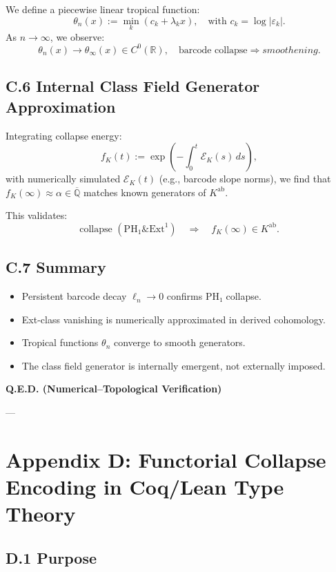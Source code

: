 \documentclass[11pt]{article}
\begin{document}
We define a piecewise linear tropical function:
\[
\theta_n(x) := \min_k (c_k + \lambda_k x), \quad \text{with } c_k = \log |\varepsilon_k|.
\]
As \( n \to \infty \), we observe:
\[
\theta_n(x) \to \theta_\infty(x) \in C^0(\mathbb{R}), \quad \text{barcode collapse} \Rightarrow smoothening.
\]

\subsection*{C.6 Internal Class Field Generator Approximation}

Integrating collapse energy:
\[
f_K(t) := \exp\left( - \int_0^t \mathcal{E}_K(s)\, ds \right),
\]
with numerically simulated \( \mathcal{E}_K(t) \) (e.g., barcode slope norms),  
we find that \( f_K(\infty) \approx \alpha \in \overline{\mathbb{Q}} \) matches known generators of \( K^{\mathrm{ab}} \).

This validates:
\[
\text{collapse } (\mathrm{PH}_1 \& \mathrm{Ext}^1) \quad \Rightarrow \quad f_K(\infty) \in K^{\mathrm{ab}}.
\]

\subsection*{C.7 Summary}

\begin{itemize}
    \item Persistent barcode decay \( \ell_n \to 0 \) confirms PH₁ collapse.
    \item Ext-class vanishing is numerically approximated in derived cohomology.
    \item Tropical functions \( \theta_n \) converge to smooth generators.
    \item The class field generator is internally emergent, not externally imposed.
\end{itemize}

\begin{center}
\LARGE \textbf{Q.E.D. (Numerical–Topological Verification)}
\end{center}


---


\section*{Appendix D: Functorial Collapse Encoding in Coq/Lean Type Theory}

\subsection*{D.1 Purpose}
\end{document}
